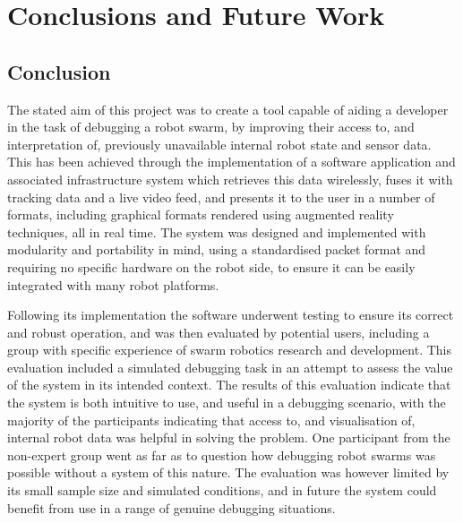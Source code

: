 
\chapter[Conclusions and Future Work]{Conclusions and Future Work} %

\label{ChapterConclusion} %


\section{Conclusion}

The stated aim of this project was to create a tool capable of aiding a developer in the task of debugging a robot swarm, by improving their access to, and interpretation of, previously unavailable internal robot state and sensor data. This has been achieved through the implementation of a software application and associated infrastructure system which retrieves this data wirelessly, fuses it with tracking data and a live video feed, and presents it to the user in a number of formats, including graphical formats rendered using augmented reality techniques, all in real time. The system was designed and implemented with modularity and portability in mind, using a standardised packet format and requiring no specific hardware on the robot side, to ensure it can be easily integrated with many robot platforms.

Following its implementation the software underwent testing to ensure its correct and robust operation, and was then evaluated by potential users, including a group with specific experience of swarm robotics research and development. This evaluation included a simulated debugging task in an attempt to assess the value of the system in its intended context. The results of this evaluation indicate that the system is both intuitive to use, and useful in a debugging scenario, with the majority of the participants indicating that access to, and visualisation of, internal robot data was helpful in solving the problem. One participant from the non-expert group went as far as to question how debugging robot swarms was possible without a system of this nature. The evaluation was however limited by its small sample size and simulated conditions, and in future the system could benefit from use in a range of genuine debugging situations.

